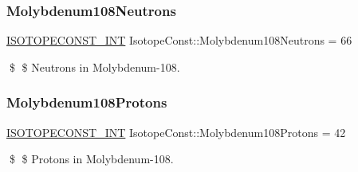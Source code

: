 \subsubsection{\texorpdfstring{Molybdenum108\+Neutrons}{Molybdenum108Neutrons}}
{\footnotesize\ttfamily \mbox{\hyperlink{group___isotope_const-_macros_ga5f18360b3e99483a35c32d789e62621c}{I\+S\+O\+T\+O\+P\+E\+C\+O\+N\+S\+T\+\_\+\+I\+NT}} Isotope\+Const\+::\+Molybdenum108\+Neutrons = 66}

\$ \$ Neutrons in Molybdenum-\/108. \mbox{\label{group___isotope_const-_molybdenum-_mo108_gaaced3d163b1aecd0ae4f9b3dd7eb14c1}} 
\subsubsection{\texorpdfstring{Molybdenum108\+Protons}{Molybdenum108Protons}}
{\footnotesize\ttfamily \mbox{\hyperlink{group___isotope_const-_macros_ga5f18360b3e99483a35c32d789e62621c}{I\+S\+O\+T\+O\+P\+E\+C\+O\+N\+S\+T\+\_\+\+I\+NT}} Isotope\+Const\+::\+Molybdenum108\+Protons = 42}

\$ \$ Protons in Molybdenum-\/108. 